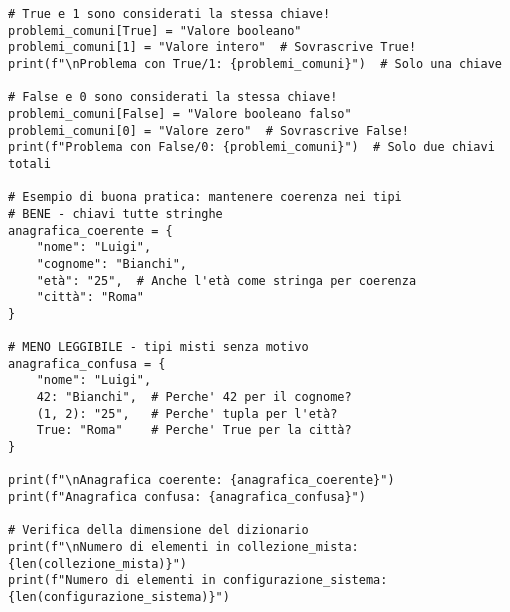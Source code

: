 \begin{lstlisting}
# True e 1 sono considerati la stessa chiave!
problemi_comuni[True] = "Valore booleano"
problemi_comuni[1] = "Valore intero"  # Sovrascrive True!
print(f"\nProblema con True/1: {problemi_comuni}")  # Solo una chiave

# False e 0 sono considerati la stessa chiave!
problemi_comuni[False] = "Valore booleano falso"
problemi_comuni[0] = "Valore zero"  # Sovrascrive False!
print(f"Problema con False/0: {problemi_comuni}")  # Solo due chiavi totali

# Esempio di buona pratica: mantenere coerenza nei tipi
# BENE - chiavi tutte stringhe
anagrafica_coerente = {
    "nome": "Luigi",
    "cognome": "Bianchi", 
    "età": "25",  # Anche l'età come stringa per coerenza
    "città": "Roma"
}

# MENO LEGGIBILE - tipi misti senza motivo
anagrafica_confusa = {
    "nome": "Luigi",
    42: "Bianchi",  # Perche' 42 per il cognome?
    (1, 2): "25",   # Perche' tupla per l'età?
    True: "Roma"    # Perche' True per la città?
}

print(f"\nAnagrafica coerente: {anagrafica_coerente}")
print(f"Anagrafica confusa: {anagrafica_confusa}")

# Verifica della dimensione del dizionario
print(f"\nNumero di elementi in collezione_mista: {len(collezione_mista)}")
print(f"Numero di elementi in configurazione_sistema: {len(configurazione_sistema)}")
\end{lstlisting}